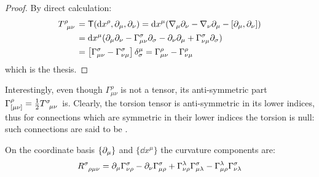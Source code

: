 \begin{proofbox}
  \begin{proof}
    By direct calculation:
    \begin{equation*}
      \begin{split}
        \tensor{T}{^\rho _\mu _\nu}
        &= \tors(\dd x^\rho, \pa_\mu, \pa_\nu) = \dd x^\mu (\na_\mu \pa_\nu - \na_\nu \pa_\mu - [\pa_\mu, \pa_\nu]) \\
        &= \dd x^\mu (\pa_\mu \pa_\nu - \Gamma^\sigma_{\mu \nu} \pa_\sigma - \pa_\nu \pa_\mu + \Gamma^\sigma_{\nu \mu} \pa_\sigma) \\
        &= \left[ \Gamma^\sigma_{\mu \nu} - \Gamma^\sigma_{\nu \mu} \right] \delta^\mu_\sigma = \Gamma^\rho_{\mu \nu} - \Gamma^\rho_{\nu \mu}
      \end{split}
    \end{equation*}
    which is the thesis.
  \end{proof}
\end{proofbox}

Interestingly, even though $ \Gamma^\rho_{\mu \nu} $ is not a tensor, its anti-symmetric part $ \Gamma^\rho_{[\mu \nu]} = \frac{1}{2} \tensor{T}{^\sigma_\mu _\nu} $ is. Clearly, the torsion tensor is anti-symmetric in its lower indices, thus for connections which are symmetric in their lower indices the torsion is null: such connections are said to be .

\begin{proposition}{}{}
  On the coordinate basis $ \{\partial_\mu\} $ and $ \{\dd x^\mu\} $ the curvature components are:
  \begin{equation}
    \tensor{R}{^\sigma _\rho _\mu _\nu} = \pa_\mu \Gamma^\sigma_{\nu \rho} - \pa_\nu \Gamma^\sigma_{\mu \rho} + \Gamma^\lambda_{\nu \rho} \Gamma^\sigma_{\mu \lambda} - \Gamma^\lambda_{\mu \rho} \Gamma^\sigma_{\nu \lambda}
    \label{eq:riemann-comp}
  \end{equation}
\end{proposition}

